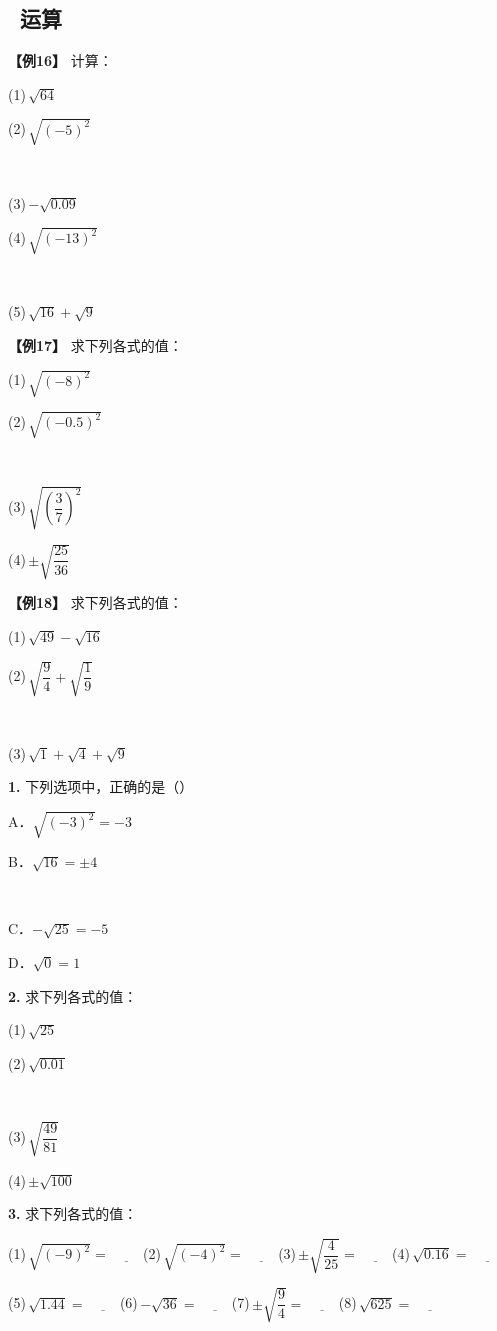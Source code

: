 \documentclass[11pt,a4paper]{ctexart}
\DeclareRobustCommand{\typetag}[1]{%
  \tikz[baseline=(X.base)]{
    \node[fill=primary, text=white, rounded corners=3pt,
          inner xsep=6pt, inner ysep=2pt, font=\small\bfseries] (X) {#1};
  }%
}
\newcommand{\choices}[4]{%
  \par\vspace{3pt}%
  \noindent
  \begin{minipage}[t]{0.47\textwidth}A．#1\end{minipage}%
  \hfill
  \begin{minipage}[t]{0.47\textwidth}B．#2\end{minipage}\\[4pt]
  \noindent
  \begin{minipage}[t]{0.47\textwidth}C．#3\end{minipage}%
  \hfill
  \begin{minipage}[t]{0.47\textwidth}D．#4\end{minipage}%
  \par\vspace{2pt}%
}
\newcommand{\subqs}[4]{%
  \par\vspace{3pt}%
  \noindent
  \begin{minipage}[t]{0.47\textwidth}#1\end{minipage}%
  \hfill
  \begin{minipage}[t]{0.47\textwidth}#2\end{minipage}\\[5pt]
  \noindent
  \begin{minipage}[t]{0.47\textwidth}#3\end{minipage}%
  \hfill
  \begin{minipage}[t]{0.47\textwidth}#4\end{minipage}%
  \par\vspace{2pt}%
}
\newcommand{\subqsThree}[3]{%
  \par\vspace{3pt}%
  \noindent
  \begin{minipage}[t]{0.47\textwidth}#1\end{minipage}%
  \hfill
  \begin{minipage}[t]{0.47\textwidth}#2\end{minipage}\\[5pt]
  \noindent
  \begin{minipage}[t]{0.47\textwidth}#3\end{minipage}%
  \par\vspace{2pt}%
}
\newcommand{\subqsFive}[5]{%
  \par\vspace{3pt}%
  \noindent
  \begin{minipage}[t]{0.47\textwidth}#1\end{minipage}%
  \hfill
  \begin{minipage}[t]{0.47\textwidth}#2\end{minipage}\\[5pt]
  \noindent
  \begin{minipage}[t]{0.47\textwidth}#3\end{minipage}%
  \hfill
  \begin{minipage}[t]{0.47\textwidth}#4\end{minipage}\\[5pt]
  \noindent
  \begin{minipage}[t]{0.47\textwidth}#5\end{minipage}%
  \par\vspace{2pt}%
}
\begin{document}
\subsection*{\typetag{题型09}\ 运算}

\begin{example}
\textbf{【例16】} 计算：

\subqsFive{(1)\,$\sqrt{64}$}{(2)\,$\sqrt{(-5)^{2}}$}{(3)\,$-\sqrt{0.09}$}{(4)\,$\sqrt{(-13)^{2}}$}{(5)\,$\sqrt{16}+\sqrt{9}$}

\medskip
\textbf{【例17】} 求下列各式的值：

\subqs{(1)\,$\sqrt{(-8)^{2}}$}{(2)\,$\sqrt{(-0.5)^{2}}$}{(3)\,$\sqrt{\left(\dfrac{3}{7}\right)^{2}}$}{(4)\,$\pm\sqrt{\dfrac{25}{36}}$}

\medskip
\textbf{【例18】} 求下列各式的值：

\subqsThree{(1)\,$\sqrt{49}-\sqrt{16}$}{(2)\,$\sqrt{\dfrac{9}{4}}+\sqrt{\dfrac{1}{9}}$}{(3)\,$\sqrt{1}+\sqrt{4}+\sqrt{9}$}
\end{example}

\begin{practice}
\textbf{1.} 下列选项中，正确的是（\quad\quad）

\choices{$\sqrt{(-3)^{2}}=-3$}{$\sqrt{16}=\pm 4$}{$-\sqrt{25}=-5$}{$\sqrt{0}=1$}

\medskip
\textbf{2.} 求下列各式的值：

\subqs{(1)\,$\sqrt{25}$}{(2)\,$\sqrt{0.01}$}{(3)\,$\sqrt{\dfrac{49}{81}}$}{(4)\,$\pm\sqrt{100}$}

\medskip
\textbf{3.} 求下列各式的值：

\noindent(1)\,$\sqrt{(-9)^{2}}=\underline{\hspace{1cm}}$\quad (2)\,$\sqrt{(-4)^{2}}=\underline{\hspace{1cm}}$\quad (3)\,$\pm\sqrt{\dfrac{4}{25}}=\underline{\hspace{1cm}}$\quad (4)\,$\sqrt{0.16}=\underline{\hspace{1cm}}$

\vspace{4pt}
\noindent(5)\,$\sqrt{1.44}=\underline{\hspace{1cm}}$\quad (6)\,$-\sqrt{36}=\underline{\hspace{1cm}}$\quad (7)\,$\pm\sqrt{\dfrac{9}{4}}=\underline{\hspace{1cm}}$\quad (8)\,$\sqrt{625}=\underline{\hspace{1cm}}$
\end{practice}
\end{document}
